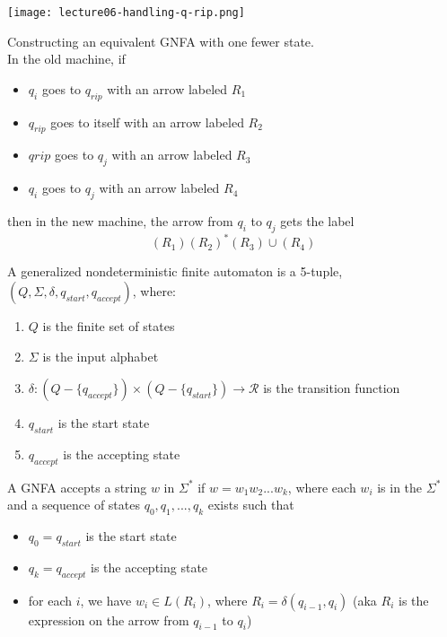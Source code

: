 \documentclass[11pt,a4paper]{article}
\begin{document}
\texttt{[image: lecture06-handling-q-rip.png]} \\

\begin{example}
    Constructing an equivalent GNFA with one fewer state. \\

    In the old machine, if
    \begin{itemize}
        \item $q_i$ goes to $q_{rip}$ with an arrow labeled $R_1$
        \item $q_{rip}$ goes to itself with an arrow labeled $R_2$
        \item $q{rip}$ goes to $q_j$ with an arrow labeled $R_3$
        \item $q_i$ goes to $q_j$ with an arrow labeled $R_4$
    \end{itemize}
    then in the new machine, the arrow from $q_i$ to $q_j$ gets the label $$(R_1)(R_2)^*(R_3)\cup(R_4)$$
\end{example}

\begin{definition}
    A generalized nondeterministic finite automaton is a 5-tuple, $(Q,\Sigma,\delta, q_{start}, q_{accept})$, where:
    \begin{enumerate}
        \item $Q$ is the finite set of states
        \item $\Sigma$ is the input alphabet
        \item $\delta:(Q-\{q_{accept}\})\times(Q-\{q_{start}\})\rightarrow\mathcal{R}$ is the transition function
        \item $q_{start}$ is the start state
        \item $q_{accept}$ is the accepting state
    \end{enumerate}
\end{definition}

A GNFA accepts a string $w$ in $\Sigma^*$ if $w=w_1w_2...w_k$, where each $w_i$ is in the $\Sigma^*$ and a sequence of states $q_0,q_1,...,q_k$ exists such that
\begin{itemize}
    \item $q_0=q_{start}$ is the start state
    \item $q_k=q_{accept}$ is the accepting state
    \item for each $i$, we have $w_i\in L(R_i)$, where $R_i=\delta(q_{i-1},q_i)$ (aka $R_i$ is the expression on the arrow from $q_{i-1}$ to $q_i$)
\end{itemize}
\end{document}
